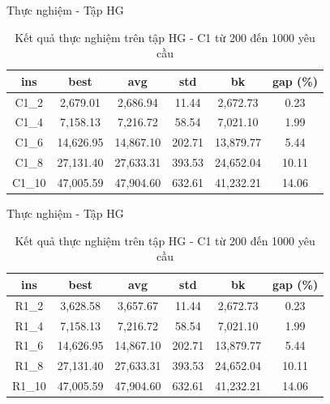\begin{frame}{Thực nghiệm - Tập HG}
  \begin{table}
    \begin{tabular}{cccccc}
      \hline
      ins & best & avg & std & bk & gap (\%) \\ \hline
      C1\_2 & 2,679.01 & 2,686.94 & 11.44 & 2,672.73 & 0.23 \\ \hline
      C1\_4 & 7,158.13 & 7,216.72 & 58.54 & 7,021.10 & 1.99 \\ \hline
      C1\_6 & 14,626.95 & 14,867.10 & 202.71 & 13,879.77 & 5.44 \\ \hline
      C1\_8 & 27,131.40 & 27,633.31 & 393.53 & 24,652.04 & 10.11 \\ \hline
      C1\_10 & 47,005.59 & 47,904.60 & 632.61 & 41,232.21 & 14.06 \\ \hline
    \end{tabular}
    \caption{Kết quả thực nghiệm trên tập HG - C1 từ 200 đến 1000 yêu cầu}
  \end{table}
\end{frame}

\begin{frame}{Thực nghiệm - Tập HG}
  \begin{table}
    \begin{tabular}{cccccc}
      \hline
      ins & best & avg & std & bk & gap (\%) \\ \hline
      R1\_2 & 3,628.58 & 3,657.67 & 11.44 & 2,672.73 & 0.23 \\ \hline
      R1\_4 & 7,158.13 & 7,216.72 & 58.54 & 7,021.10 & 1.99 \\ \hline
      R1\_6 & 14,626.95 & 14,867.10 & 202.71 & 13,879.77 & 5.44 \\ \hline
      R1\_8 & 27,131.40 & 27,633.31 & 393.53 & 24,652.04 & 10.11 \\ \hline
      R1\_10 & 47,005.59 & 47,904.60 & 632.61 & 41,232.21 & 14.06 \\ \hline
    \end{tabular}
    \caption{Kết quả thực nghiệm trên tập HG - C1 từ 200 đến 1000 yêu cầu}
  \end{table}
\end{frame}